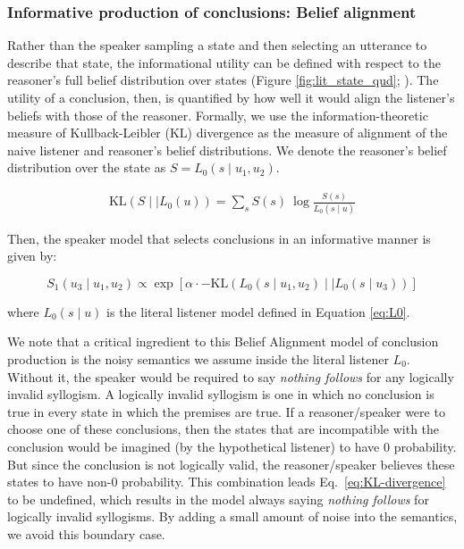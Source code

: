 \documentclass[floatsintext, man]{apa6}
\begin{document}
\subsubsection{Informative production of conclusions: Belief alignment}

Rather than the speaker sampling a state and then selecting an utterance to describe that state, the informational utility can be defined with respect to the reasoner's full belief distribution over states (Figure \ref{fig:lit_state_qud}; ). 
The utility of a conclusion, then, is quantified by how well it would align the listener's beliefs with those of the reasoner. 
Formally, we use the information-theoretic measure of Kullback-Leibler (KL) divergence as the measure of alignment of the naive listener and reasoner's belief distributions. 
We denote the reasoner's belief distribution over the state as $S= L_0(s \mid  u_1,u_2)$. 

\begin{align}
  \label{eq:KL-divergence}
  \text{KL}({ S \mid \mid L_0}(u)) = \sum_{s}  S(s) \ \log \frac{ S(s)}{{L_{0}}(s \mid u)}
\end{align}

\noindent Then, the speaker model that selects conclusions in an informative manner is given by: 

\begin{equation}
S_1(u_3 \mid u_1,  u_2) \propto  \exp [ \alpha \cdot - \text{KL}({ L_0(s \mid  u_1,u_2) \mid \mid L_0}(s \mid u_3)) ]  \label{eq:R1b}
\end{equation}

\noindent where $L_0(s \mid u)$ is the literal listener model defined in Equation \ref{eq:L0}. 

We note that a critical ingredient to this Belief Alignment model of conclusion production is the noisy semantics we assume inside the literal listener $L_0$.
Without it, the speaker would be required to say \emph{nothing follows} for any logically invalid syllogism. 
A logically invalid syllogism is one in which no conclusion is true in every state in which the premises are true.
If a reasoner/speaker were to choose one of these conclusions, then the states that are incompatible with the conclusion would be imagined (by the hypothetical listener) to have 0 probability. 
But since the conclusion is not logically valid, the reasoner/speaker believes these states to have non-0 probability.
This combination leads Eq.~\ref{eq:KL-divergence} to be undefined, which results in the model always saying \emph{nothing follows} for logically invalid syllogisms.
By adding a small amount of noise into the semantics, we avoid this boundary case.
\end{document}
